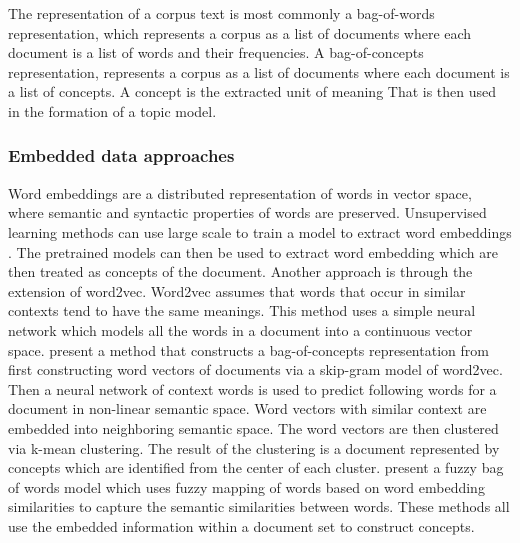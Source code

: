 The representation of a corpus text is most commonly a bag-of-words representation, which represents a corpus as a list of documents where each document is a list of words and their frequencies. A bag-of-concepts representation, represents a corpus as a list of documents where each document is a list of concepts. A concept is the extracted unit of meaning That is then used in the formation of a topic model.

\subsubsection{Embedded data approaches}
Word embeddings are a distributed representation of words in vector space, where semantic and syntactic properties of words are preserved. Unsupervised learning methods can use large scale to train a model to extract word embeddings \citep{mikolov2013efficient,mikolov2013efficient,pennington2014glove}. The pretrained models can then be used to extract word embedding which are then treated as concepts of the document. Another approach is through the extension of word2vec. Word2vec assumes that words that occur in similar contexts tend to have the same meanings. This method uses a simple neural network which models all the words in a document into a continuous vector space. \citet{kim2017bag} present a method that constructs a bag-of-concepts representation from first constructing word vectors of documents via a skip-gram model of word2vec. Then a neural network of context words is used to predict following words for a document in non-linear semantic space. Word vectors with similar context are embedded into neighboring semantic space. The word vectors are then clustered via k-mean clustering. The result of the clustering is a document represented by concepts which are identified from the center of each cluster. \citet{zhao2017fuzzy} present a fuzzy bag of words model which uses fuzzy mapping of words based on word embedding similarities to capture the semantic similarities between words. These methods all use the embedded information within a document set to construct concepts. 


